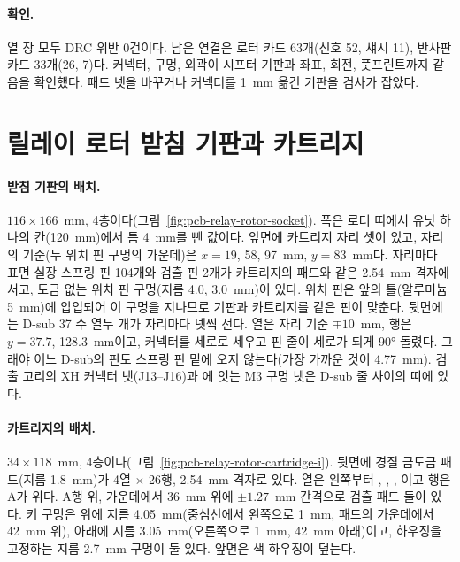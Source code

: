 \paragraph{확인.} 열 장 모두 DRC 위반 0건이다. 남은 연결은 로터 카드 63개(신호 52, 섀시 11), 반사판 카드 33개(26, 7)다.
커넥터, 구멍, 외곽이 시프터 기판과 좌표, 회전, 풋프린트까지 같음을 확인했다. 패드 넷을 바꾸거나 커넥터를 1~mm 옮긴
기판을 검사가 잡았다.


\section{릴레이 로터 받침 기판과 카트리지}\label{pcb:rotor-cartridge}

\paragraph{받침 기판의 배치.} $116 \times 166$~mm, 4층이다(그림~\ref{fig:pcb-relay-rotor-socket}). 폭은 로터 띠에서 유닛
하나의 칸(120~mm)에서 틈 4~mm를 뺀 값이다. 앞면에 카트리지 자리 셋이 있고, 자리의 기준(두 위치 핀 구멍의 가운데)은
$x = 19$, 58, 97~mm, $y = 83$~mm다. 자리마다 표면 실장 스프링 핀 104개와 검출 핀 2개가 카트리지의 패드와 같은
2.54~mm 격자에 서고, 도금 없는 위치 핀 구멍(지름 4.0, 3.0~mm)이 있다. 위치 핀은 앞의 틀(알루미늄 5~mm)에 압입되어 이
구멍을 지나므로 기판과 카트리지를 같은 핀이 맞춘다. 뒷면에는 D-sub 37 수 열두 개가 자리마다 넷씩 선다. 열은 자리
기준 $\mp 10$~mm, 행은 $y = 37.7$, 128.3~mm이고, 커넥터를 세로로 세우고 핀 줄이 세로가 되게 90° 돌렸다. 그래야 어느
D-sub의 핀도 스프링 핀 밑에 오지 않는다(가장 가까운 것이 4.77~mm). 검출 고리의 XH 커넥터 넷(J13--J16)과
에 잇는 M3 구멍 넷은 D-sub 줄 사이의 띠에 있다.

\paragraph{카트리지의 배치.} $34 \times 118$~mm, 4층이다(그림~\ref{fig:pcb-relay-rotor-cartridge-i}). 뒷면에 경질 금도금
패드(지름 1.8~mm)가 4열 $\times$ 26행, 2.54~mm 격자로 있다. 열은 왼쪽부터 , , , 이고
행은 A가 위다. A행 위, 가운데에서 36~mm 위에 $\pm 1.27$~mm 간격으로 검출 패드 둘이 있다. 키 구멍은 위에 지름
4.05~mm(중심선에서 왼쪽으로 1~mm, 패드의 가운데에서 42~mm 위), 아래에 지름 3.05~mm(오른쪽으로 1~mm, 42~mm 아래)이고,
하우징을 고정하는 지름 2.7~mm 구멍이 둘 있다. 앞면은 색 하우징이 덮는다.

